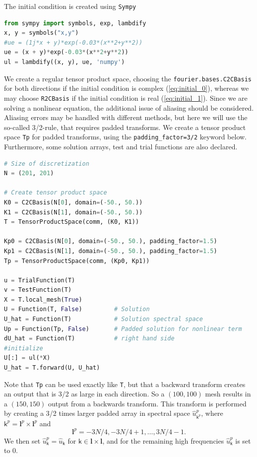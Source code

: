 \documentclass[%
oneside,                 %
final,                   %
10pt]{article}
\begin{document}
The initial condition is created using \texttt{Sympy}
\begin{lstlisting}[language=Python,style=yellow2_fb]
from sympy import symbols, exp, lambdify
x, y = symbols("x,y")
#ue = (1j*x + y)*exp(-0.03*(x**2+y**2))
ue = (x + y)*exp(-0.03*(x**2+y**2))
ul = lambdify((x, y), ue, 'numpy')
\end{lstlisting}
We create a regular tensor product space, choosing the \texttt{fourier.bases.C2CBasis} for both directions if the initial condition is complex (\ref{eq:initial_0}), whereas we may choose \texttt{R2CBasis} if the initial condition is real (\ref{eq:initial_1}). Since we are solving a nonlinear equation, the additional issue of aliasing should be considered. Aliasing errors may be handled with different methods, but here we will use the so-called 3/2-rule, that requires padded transforms. We create a tensor product space \texttt{Tp} for padded transforms, using the \Verb!padding_factor=3/2! keyword below. Furthermore, some solution arrays, test and trial functions are also declared.
\begin{lstlisting}[language=Python,style=yellow2_fb]
# Size of discretization
N = (201, 201)

# Create tensor product space
K0 = C2CBasis(N[0], domain=(-50., 50.))
K1 = C2CBasis(N[1], domain=(-50., 50.))
T = TensorProductSpace(comm, (K0, K1))

Kp0 = C2CBasis(N[0], domain=(-50., 50.), padding_factor=1.5)
Kp1 = C2CBasis(N[1], domain=(-50., 50.), padding_factor=1.5)
Tp = TensorProductSpace(comm, (Kp0, Kp1))

u = TrialFunction(T)
v = TestFunction(T)
X = T.local_mesh(True)
U = Function(T, False)         # Solution
U_hat = Function(T)            # Solution spectral space
Up = Function(Tp, False)       # Padded solution for nonlinear term
dU_hat = Function(T)           # right hand side
#initialize
U[:] = ul(*X)
U_hat = T.forward(U, U_hat)
\end{lstlisting}
Note that \texttt{Tp} can be used exactly like \texttt{T}, but that a backward transform creates an output that is 3/2 as large in each direction. So a $(100, 100)$ mesh results in a $(150, 150)$ output from a backwards transform. This transform is performed by creating a 3/2 times larger padded array in spectral space $\hat{u}^p_{\textsf{k}^p}$, where $\textsf{k}^p = \boldsymbol{l}^p \times \boldsymbol{l}^p $ and
\begin{equation}
\boldsymbol{l}^{p} = -3N/4, -3N/4+1, \ldots, 3N/4-1.
\end{equation}
We then set $\hat{u}^p_{\textsf{k}} = \hat{u}_{\textsf{k}}$ for $\textsf{k} \in \boldsymbol{l} \times \boldsymbol{l}$, and for the remaining high frequencies $\hat{u}^p_{\textsf{k}}$ is set to 0.
\end{document}
